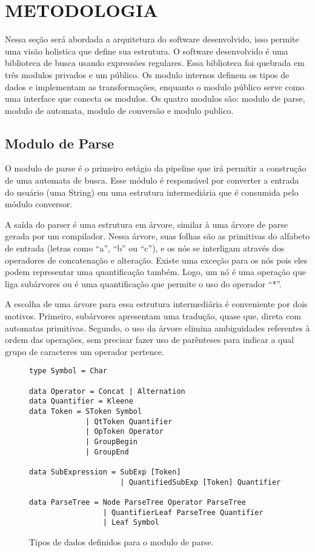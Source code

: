 \section{METODOLOGIA}
Nessa seção será abordada a arquitetura do software desenvolvido, isso permite uma visão holistica que define sua estrutura.
O software desenvolvido é uma biblioteca de busca usando expressões regulares.
Essa biblioteca foi quebrada em três modulos privados e um público.
Os modulo internos definem os tipos de dados e implementam as transformações, enquanto o modulo público serve como uma interface que conecta os modulos.
Os quatro modulos são: modulo de parse, modulo de automata, modulo de conversão e modulo publico.

\subsection{Modulo de Parse}

O modulo de parse é o primeiro estágio da pipeline que irá permitir a construção de uma automata de busca.
Esse módulo é responsável por converter a entrada do usuário (uma String) em uma estrutura intermediária que é consumida pelo módulo conversor.

A saída do parser é uma estrutura em árvore, similar à uma árvore de parse gerada por um compilador.
Nessa árvore, suas folhas são as primitivas do alfabeto de entrada (letras como “a”, “b” ou “c”), e os nós se interligam através dos operadores de concatenação e alteração.
Existe uma exceção para os nós pois eles podem representar uma quantificação também.
Logo, um nó é uma operação que liga subárvores ou é uma quantificação que permite o uso do operador “*”.

A escolha de uma árvore para essa estrutura intermediária é conveniente por dois motivos. 
Primeiro, subárvores apresentam uma tradução, quase que, direta com automatas primitivas.
Segundo, o uso da árvore elimina ambiguidades referentes à ordem das operações, sem precisar fazer uso de parênteses para indicar a qual grupo de caracteres um operador pertence.

\begin{figure}
\begin{lstlisting}
type Symbol = Char

data Operator = Concat | Alternation
data Quantifier = Kleene
data Token = SToken Symbol 
             | QtToken Quantifier 
             | OpToken Operator 
             | GroupBegin 
             | GroupEnd

data SubExpression = SubExp [Token] 
                     | QuantifiedSubExp [Token] Quantifier

data ParseTree = Node ParseTree Operator ParseTree 
                 | QuantifierLeaf ParseTree Quantifier 
                 | Leaf Symbol

\end{lstlisting}
\caption{Tipos de dados definidos para o modulo de parse.}
\label{f-data-parse}
\end{figure}



